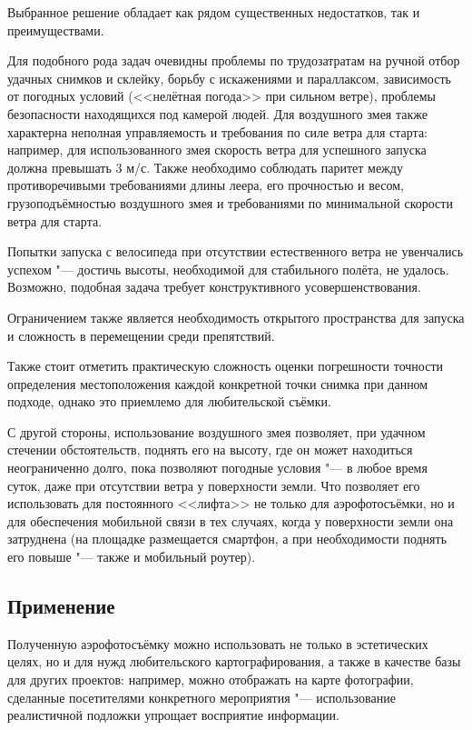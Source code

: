 \documentclass[10pt, a5paper]{article}
\begin{document}
Выбранное решение обладает как рядом существенных недостатков, так и преимуществами.

Для подобного рода задач очевидны проблемы по трудозатратам на ручной отбор удачных снимков и склейку, борьбу с искажениями и параллаксом, зависимость от погодных условий (<<нелётная погода>> при сильном ветре), проблемы безопасности находящихся под камерой людей. Для воздушного змея также характерна неполная управляемость и требования по силе ветра для старта: например, для использованного змея скорость ветра для успешного запуска должна превышать 3 м/с. Также необходимо соблюдать паритет между противоречивыми требованиями длины леера, его прочностью и весом, грузоподъёмностью воздушного змея и требованиями по минимальной скорости ветра для старта.

Попытки запуска с велосипеда при отсутствии естественного ветра не увенчались успехом "--- достичь высоты, необходимой для стабильного полёта, не удалось. Возможно, подобная задача требует конструктивного усовершенствования.

Ограничением также является необходимость открытого пространства для запуска и сложность в перемещении среди препятствий.

Также стоит отметить практическую сложность оценки погрешности точности определения местоположения каждой конкретной точки снимка при данном подходе, однако это приемлемо для любительской съёмки.

С другой стороны, использование воздушного змея позволяет, при удачном стечении обстоятельств, поднять его на высоту, где он может находиться неограниченно долго, пока позволяют погодные условия "--- в любое время суток, даже при отсутствии ветра у поверхности земли. Что позволяет его использовать для постоянного <<лифта>> не только для аэрофотосъёмки, но и для обеспечения мобильной связи в тех случаях, когда у поверхности земли она затруднена (на площадке размещается смартфон, а при необходимости поднять его повыше "--- также и мобильный роутер).

\subsection*{Применение}

Полученную аэрофотосъёмку можно использовать не только в эстетических целях, но и для нужд любительского картографирования, а также в качестве базы для других проектов: например, можно отображать на карте фотографии, сделанные посетителями конкретного мероприятия "--- использование реалистичной подложки упрощает восприятие информации.
\end{document}
